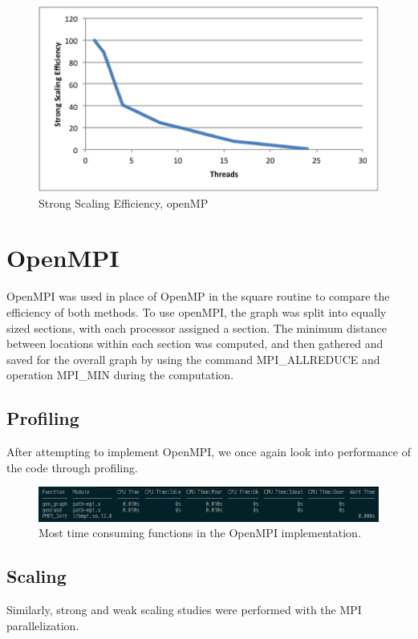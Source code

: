 \documentclass{article}
\begin{document}
	\begin{figure}[h!]
		\begin{center}
			\includegraphics[width=0.7\columnwidth]{st_graph_mp}
			\caption{Strong Scaling Efficiency, openMP}
			\label{mp_st_g}
		\end{center}
	\end{figure}
	
	
\section{OpenMPI}

OpenMPI was used in place of OpenMP in the square routine to compare the efficiency of both methods. To use openMPI, the graph was split into equally sized sections, with each processor assigned a section. The minimum distance between locations within each section was computed, and then gathered and saved for the overall graph by using the command MPI\_ALLREDUCE and operation MPI\_MIN during the computation.  

\subsection{Profiling}
After attempting to implement OpenMPI, we once again look into performance of the code through profiling. 
	\begin{figure}[h!]
		\begin{center}
			\includegraphics[width=0.7\columnwidth]{amplxe_mpi}
			\caption{Most time consuming functions in the OpenMPI implementation.}
			\label{amplxe_mpi}
		\end{center}
	\end{figure}

\subsection{Scaling}
Similarly, strong and weak scaling studies were performed with the MPI parallelization.
\end{document}
